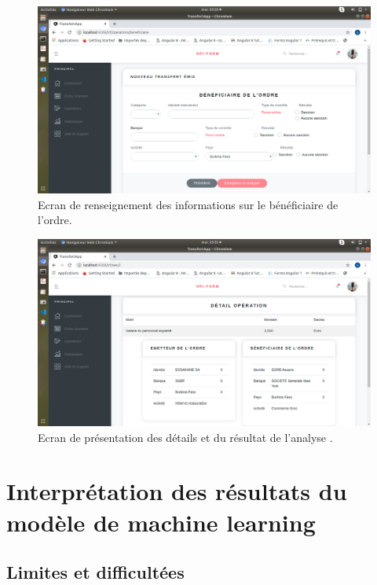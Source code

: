 \begin{figure}[h!]
  \begin{center}
    \includegraphics[width=14cm]{images/beneficiaire.png}
    \caption{Ecran de renseignement des informations sur le bénéficiaire de l'ordre.\label{fig:beneficiaire}}
  \end{center}
\end{figure}

\begin{figure}[h!]
  \begin{center}
    \includegraphics[width=13cm]{images/analyse.png}
    \caption{Ecran de présentation des détails et du résultat de l'analyse .\label{fig:analyse}}
  \end{center}
\end{figure}

   \section{Interprétation des résultats du modèle de machine learning}

  \subsection{Limites et difficultées}

